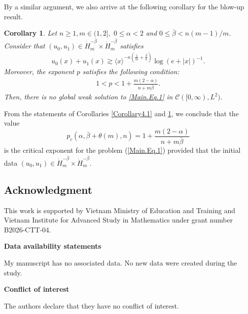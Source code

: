 \documentclass[11pt,reqno]{amsart}
\newtheorem{corollary}{Corollary}[section]
\begin{document}
By a similar argument, we also arrive at the following corollary for the blow-up result.

\begin{corollary}\label{Corollary4.2}
    Let $n \geq 1, m \in (1,2], \,\, 0 \leq \alpha < 2$ and $0 \leq  \bar{\beta} < n(m-1)/m$. Consider that $(u_0, u_1) \in \dot{H}_m^{-\bar{\beta}} \times \dot{H}_m^{-\bar{\beta}} $ satisfies
        \begin{align*}
         u_0(x) + u_1(x) \gtrsim \langle x \rangle^{-n(\frac{1}{m}+\frac{\bar{\beta}}{n})} \log(e+|x|)^{-1}.  
        \end{align*}
        Moreover, the exponent $p$ satisfies the following condition:
        \begin{align*}
            1 < p < 1+\frac{m(2-\alpha)}{n+m\bar{\beta}}.
        \end{align*}
        Then, there is no global weak solution to \eqref{Main.Eq.1} in $\mathcal{C}([0, \infty), L^2)$.
\end{corollary}

From the statements of Corollaries \ref{Corollary4.1} and \ref{Corollary4.2}, we conclude that the value $$p_c(\alpha, \bar{\beta}+\theta(m), n) =1+ \frac{m(2-\alpha)}{n+m\bar{\beta}} $$ is the critical exponent for the problem (\ref{Main.Eq.1}) provided that the initial data $(u_0, u_1) \in \dot{H}_m^{-\bar{\beta}} \times \dot{H}_m^{-\bar{\beta}}$.









\subsection*{Acknowledgment}
This work is supported by Vietnam Ministry of Education and Training and Vietnam Institute for Advanced Study in Mathematics under grant number B2026-CTT-04.
\medskip

\noindent\textbf{Data availability statements}

\noindent My manuscript has no associated data. No new data were created during the study.
\medskip

\noindent\textbf{Conflict of interest}

\noindent The authors declare that they have no conflict of interest.
\end{document}
